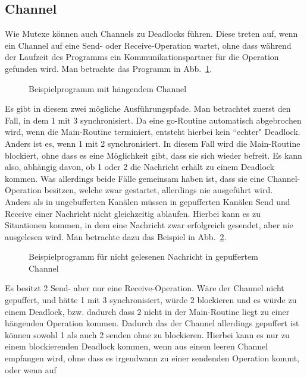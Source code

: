\subsection{Channel}
Wie Mutexe können auch Channels zu Deadlocks führen. Diese treten auf,
wenn ein Channel auf eine Send- oder Receive-Operation wartet, ohne dass
während der Laufzeit des Programms ein Kommunikationspartner für die 
Operation gefunden wird.
Man betrachte das Programm in Abb.~\ref{Chap:Analyze-Sec:Channel-SubSec:Dangling-Fig:ExDangling}.
\begin{figure}[h!]
  
  \caption{Beispielprogramm mit hängendem Channel}
  \label{Chap:Analyze-Sec:Channel-SubSec:Dangling-Fig:ExDangling}
\end{figure}
Es gibt in diesem zwei mögliche Ausführungspfade. Man betrachtet zuerst den Fall, in dem 1 mit 3 synchronisiert. 
Da eine go-Routine automatisch abgebrochen wird,  
wenn die Main-Routine terminiert, entsteht hierbei kein ``echter" Deadlock. Anders ist es, wenn 1 mit 2 synchronisiert. 
In diesem Fall wird die Main-Routine blockiert, ohne dass es eine Möglichkeit gibt, dass sie sich wieder 
befreit. Es kann also, abhängig davon, ob 1 oder 2 die Nachricht erhält zu einem Deadlock kommen. Was 
allerdings beide Fälle gemeinsam haben ist, dass sie eine Channel-Operation besitzen, welche zwar 
gestartet, allerdings nie ausgeführt wird.\\
Anders als in ungebufferten Kanälen müssen in gepufferten Kanälen Send und 
Receive einer Nachricht nicht gleichzeitig ablaufen. Hierbei kann es 
zu Situationen kommen, in dem eine Nachricht zwar erfolgreich gesendet, aber
nie ausgelesen wird. Man betrachte dazu das Beispiel in 
Abb.~\ref{Chap:Analyze-Sec:Channel-SubSec:Buffered-Fig:Ex1}.
\begin{figure}[h!]
  
  \caption{Beispielprogramm für nicht gelesenen Nachricht in gepuffertem Channel} 
  \label{Chap:Analyze-Sec:Channel-SubSec:Buffered-Fig:Ex1}
\end{figure}
Es besitzt 2 Send- aber nur eine Receive-Operation. Wäre der Channel nicht 
gepuffert, und hätte 1 mit 3 synchronisiert, würde 2 blockieren und es 
würde zu einem Deadlock, bzw. dadurch dass 2 nicht in der Main-Routine liegt
zu einer hängenden Operation kommen. Dadurch das der Channel allerdings gepuffert ist
können sowohl 1 als auch 2 senden ohne zu blockieren. Hierbei kann es nur 
zu einem blockierenden Deadlock kommen, wenn aus einem leeren Channel empfangen wird, 
ohne dass es irgendwann zu einer sendenden Operation kommt, oder wenn auf 

